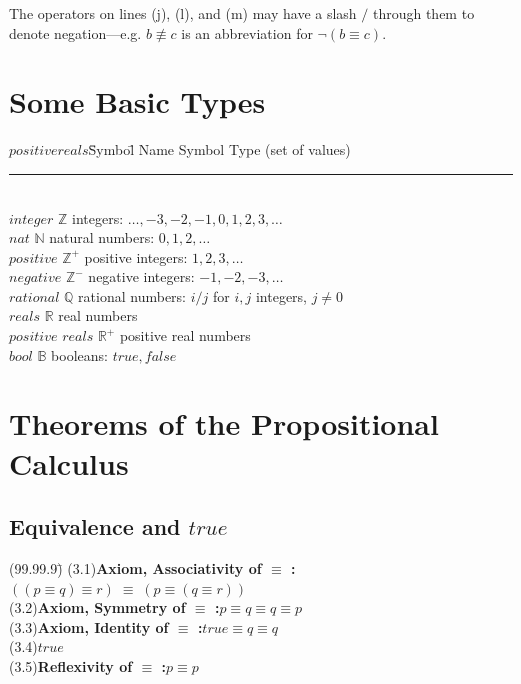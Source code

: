 \documentclass{amsart}
\newcommand{\lgap}{2pt}                             %
\newcommand{\equivs}{\ensuremath{\;\equiv\;}}       %
\newcommand{\nequiv}{\ensuremath{\not\equiv}}       %
\begin{document}
The operators on lines (j), (l), and (m) may have a slash $/$ through them to denote negation---e.g.
$b\nequiv c$ is an abbreviation for $\neg(b \equiv c)$.

\section*{Some Basic Types}
\begin{tabbing}
$positive reals$\quad\quad\= Symbol\quad\quad\=\kill
Name                \>Symbol           \> Type (set of values)\\[-8pt]
\rule{5in}{0.5pt}\\
$integer$           \>$\mathbb{Z}$     \> integers: $\ldots , -3, -2, -1, 0, 1, 2, 3, \ldots$\\[\lgap]
$nat$               \>$\mathbb{N}$     \> natural numbers: $0, 1, 2, \ldots$\\[\lgap]
$positive$          \>$\mathbb{Z}^{+}$ \> positive integers: $1, 2, 3, \ldots$\\[\lgap]
$negative$          \>$\mathbb{Z}^{-}$ \> negative integers: $-1, -2, -3, \ldots$\\[\lgap]
$rational$          \>$\mathbb{Q}$     \> rational numbers: $i/j$ for $i,j$ integers, $j\ne 0$\\[\lgap]
$reals$             \>$\mathbb{R}$     \> real numbers\\[\lgap]
$positive$ $reals$  \>$\mathbb{R}^{+}$ \> positive real numbers\\[\lgap]
$bool$              \>$\mathbb{B}$     \> booleans: $true, false$
\end{tabbing}

\section*{Theorems of the Propositional Calculus}

\subsection*{Equivalence and $true$}
\begin{tabbing}
(99.99.9)\;\=\kill
(3.1)\>\textbf{Axiom, Associativity of $\equiv$ :}\quad $((p\equiv q) \equiv r)\equivs (p\equiv (q\equiv r))$\\[\lgap]
(3.2)\>\textbf{Axiom, Symmetry of $\equiv$ :}\quad $p\equiv q \equiv q\equiv p$\\[\lgap]
(3.3)\>\textbf{Axiom, Identity of $\equiv$ :}\quad $true\equiv q \equiv q$\\[\lgap]
(3.4)\>$true$\\[\lgap]
(3.5)\>\textbf{Reflexivity of $\equiv$ :}\quad $p\equiv p$\\
\end{tabbing}
\end{document}
